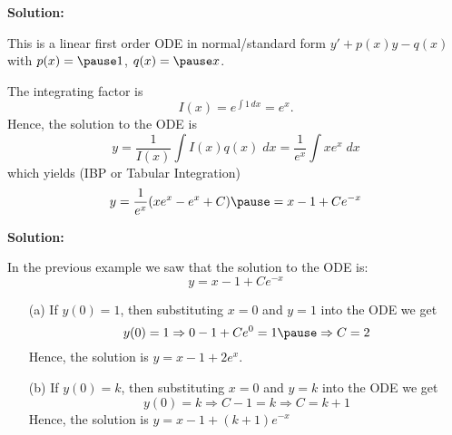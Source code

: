 \begin{frame}
\begin{example}[Solve: $y'+y=x$.]
\textbf{Solution:} \pause 

This is a linear first order ODE in normal/standard
 form $ y'+p(x)y-q(x) $ with $p(x)= \pause 1$, $q(x)= \pause x$. 
 
The integrating factor is $$I(x)=e^{\int 1\,dx}=e^x.$$ \pause
Hence, the solution to the ODE is
$$y=\frac{1}{I(x)}\int I(x)q(x)\;dx = \frac{1}{e^x}\int xe^x\;dx $$
\pause
which yields (IBP or Tabular Integration)
$$y=\frac{1}{e^x}(xe^x-e^x+C)\pause = x-1+Ce^{-x} $$
\end{example}  
\end{frame}

\begin{frame}
\begin{example}[Solve the Initial Value Problem: $y'+y=x$, and\\ (a) $y(0)=1$ (b) $y(0)=k$.]
\textbf{Solution:} 
\pause 

In the previous example we saw that the solution to the ODE is:
$$y= x-1+Ce^{-x} $$
\pause 
\begin{enumerate}
\item[(a)] If $ y(0)=1 $, then substituting $ x=0 $ and $ y=1 $ into the ODE we get
\[
y(0)=1 \Rightarrow 0-1+Ce^0=1  \pause  \Rightarrow C=2
\]
\pause 
Hence, the solution is $y=x-1+2e^x$. \pause 
\item[(b)] If $ y(0)=k $, then substituting $ x=0 $ and $ y=k $ into the ODE we get
\[
y(0)=k \Rightarrow C-1=k \Rightarrow C=k+1
\]
\pause 
Hence, the solution is $y=x-1+(k+1)e^{-x}$
\end{enumerate}
\end{example}  
\end{frame}


